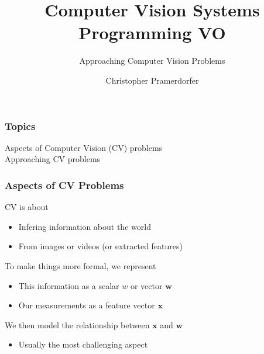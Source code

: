 \documentclass[xetex,professionalfont]{beamer}
\title{Computer Vision Systems Programming VO}
\subtitle{Approaching Computer Vision Problems}
\author{Christopher Pramerdorfer}
\institute{Computer Vision Lab, Vienna University of Technology}
\renewcommand{\vec}[1]{\ensuremath{\mathbf{#1}}}
\newcommand{\vw}{\vec{w}}
\newcommand{\vx}{\vec{x}}
\renewcommand\emph[1]{\textcolor{tuwcvl_inf_red}{#1}}
\begin{document}

\begin{frame}
\maketitle
\end{frame}


\begin{frame}[fragile]
\frametitle{Topics}

Aspects of Computer Vision (CV) problems \\\medskip
Approaching CV problems

\bigskip
\begin{center}
\end{center}

\end{frame}


\begin{frame}
\frametitle{Aspects of CV Problems}

CV is about
\begin{itemize}
    \item Infering information about the world
    \item From images or videos (or extracted features)
\end{itemize}

\bigskip
To make things more formal, we represent
\begin{itemize}
    \item This information as a scalar $w$ or vector $\vw$
    \item Our measurements as a \emph{feature vector} $\vx$
\end{itemize}

\bigskip
We then \emph{model} the relationship between $\vx$ and $\vw$
\begin{itemize}
    \item Usually the most challenging aspect
\end{itemize}

\end{frame}
\end{document}
